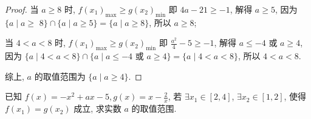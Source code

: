 \begin{proof}
当 \(a \geq  8\) 时, \(f{\left( {x}_{1}\right) }_{\max } \geq  g{\left( {x}_{2}\right) }_{\min }\) 即 \({4a} -{21} \geq   -1\), 解得 \(a \geq  5\), 因为 \(\{ a \mid  a \geq\)  \(8\}  \cap  \{ a \mid  a \geq  5\}  = \{ a \mid  a \geq  8\}\), 所以 \(a \geq  8\);

当 \(4 < a < 8\) 时, \(f{\left( {x}_{1}\right) }_{\max } \geq  g{\left( {x}_{2}\right) }_{\min }\) 即 \(\frac{{a}^{2}}{4} -5 \geq   -1\), 解得 \(a \leq   -4\) 或 \(a \geq  4\), 因为 \(\{ a \mid  4 < a < 8\}  \cap  \{ a \mid  a \leq   -4\) 或 \(a \geq  4\}  = \{ a \mid  4 < a < 8\}\), 所以 \(4 < a < 8\).

综上, \(a\) 的取值范围为 \(\{ a \mid  a \geq  4\}\).
\end{proof}


\begin{variation}\label{variation:2.1.13}
  已知 \(f(x)  =  -{x}^{2} + {ax} -5, g(x)  = x -\frac{2}{x}\), 若 \(\exists {x}_{1} \in  \left\lbrack  {2, 4}\right\rbrack\), \(\exists {x}_{2} \in  \left\lbrack  {1, 2}\right\rbrack\), 使得 \(f\left( {x}_{1}\right)  = g\left( {x}_{2}\right)\) 成立, 求实数 \(a\) 的取值范围.
\end{variation}

